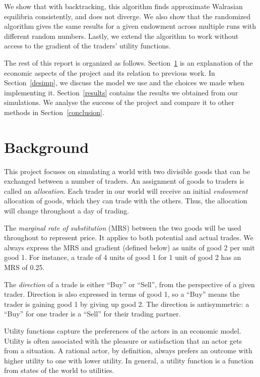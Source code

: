 \documentclass[12pt,a4paper,titlepage]{article}
\begin{document}
We show that with backtracking, this algorithm finds approximate Walrasian equilibria consistently, and does not diverge.
We also show that the randomized algorithm gives the same results for a given endowment across multiple runs with different random numbers.
Lastly, we extend the algorithm to work without access to the gradient of the traders' utility functions.


The rest of this report is organized as follows.
Section~\ref{background} is an explanation of the economic aspects of the project and its relation to previous work.
In Section~\ref{desimp}, we discuss the model we use and the choices we made when implementing it.
Section~\ref{results} contains the results we obtained from our simulations.
We analyse the success of the project and compare it to other methods in Section~\ref{conclusion}. 

\section{Background}\label{background}

This project focuses on simulating a world with two divisible goods that can be exchanged between a number of traders.
An assignment of goods to traders is called an \textit{allocation}.
Each trader in our world will receive an initial \textit{endowment} allocation of goods, which they can trade with the others.
Thus, the allocation will change throughout a day of trading.

The \textit{marginal rate of substitution} (MRS) between the two goods will be used throughout to represent price.
It applies to both potential and actual trades.
We always express the MRS and gradient (defined below) as units of good 2 per unit good 1.
For instance, a trade of 4 units of good 1 for 1 unit of good 2 has an MRS of 0.25.

The \textit{direction} of a trade is either ``Buy'' or ``Sell'', from the perspective of a given trader.
Direction is also expressed in terms of good 1, so a ``Buy'' means the trader is gaining good 1 by giving up good 2.
The direction is antisymmetric: a ``Buy'' for one trader is a ``Sell'' for their trading partner.

Utility functions capture the preferences of the actors in an economic model.
Utility is often associated with the pleasure or satisfaction that an actor gets from a situation.
A rational actor, by definition, always prefers an outcome with higher utility to one with lower utility. 
In general, a utility function is a function from states of the world to utilities.
\end{document}
